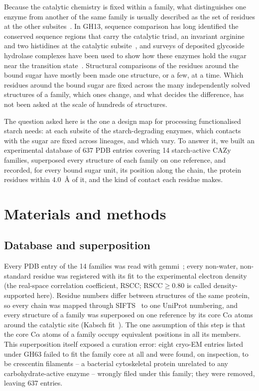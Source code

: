 \documentclass[preprint,12pt]{elsarticle}
\begin{document}
Because the catalytic chemistry is fixed within a family, what distinguishes one enzyme
from another of the same family is usually described as the set of residues at the
other subsites~\citep{Davies1995}. In GH13, sequence comparison has long identified the
conserved sequence regions that carry the catalytic triad, an invariant arginine and two
histidines at the catalytic subsite~\citep{MacGregor2001,Janecek2014}, and surveys of
deposited glycoside hydrolase complexes have been used to show how these enzymes hold the
sugar near the transition state~\citep{Quirke2020}. Structural comparisons of the residues
around the bound sugar have mostly been made one structure, or a few, at a time. Which residues around the bound sugar are fixed across the many independently solved
structures of a family, which ones change, and what decides the difference, has not been
asked at the scale of hundreds of structures.

The question asked here is the one a design map for processing functionalised starch
needs: at each subsite of the starch-degrading enzymes, which contacts with the sugar are
fixed across lineages, and which vary. To answer it, we built an experimental database of
637 PDB entries covering 14 starch-active CAZy families, superposed every structure of each family on one reference, and recorded, for
every bound sugar unit, its position along the chain, the protein residues within
4.0~\AA{} of it, and the kind of contact each residue makes.


\section{Materials and methods}

\subsection{Database and superposition}
Every PDB entry of the 14 families was read
with gemmi~\citep{Wojdyr2022}; every non-water, non-standard residue was registered with
its fit to the experimental electron density (the real-space correlation coefficient,
RSCC; $\mathrm{RSCC}\ge0.80$ is called density-supported here). Residue numbers differ
between structures of the same protein, so every chain was mapped through
SIFTS~\citep{Velankar2013} to one UniProt numbering, and every structure of a family was
superposed on one reference by its core C$\alpha$ atoms around the catalytic site
(Kabsch fit~\citep{Kabsch1976}). The one assumption of this step is that the core
C$\alpha$ atoms of a family occupy equivalent positions in all its members. This
superposition itself exposed a curation error: eight cryo-EM entries listed under GH63
failed to fit the family core at all and were found, on inspection, to be crescentin
filaments -- a bacterial cytoskeletal protein unrelated to any carbohydrate-active
enzyme -- wrongly filed under this family; they were removed, leaving 637 entries.
\end{document}
